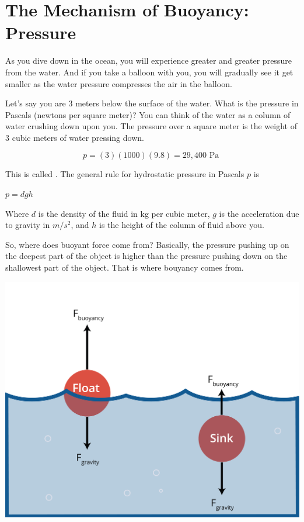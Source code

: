 \section{The Mechanism of Buoyancy: Pressure}

As you dive down in the ocean, you will experience greater and
greater pressure from the water. And if you take a balloon with you, you
will gradually see it get smaller as the water pressure compresses the
air in the balloon.

Let's say you are 3 meters below the surface of the water. What is the
pressure in Pascals (newtons per square meter)? You can think of the
water as a column of water crushing down upon you. The pressure over
a square meter is the weight of 3 cubic meters of water pressing down.

$$p = (3)(1000)(9.8) = 29,400 \text{ Pa }$$

This is called . The general rule for
hydrostatic pressure in Pascals $p$ is

$p = d g h$

Where  $d$ is the density of the fluid
in kg per cubic meter, $g$ is the acceleration due to gravity in
$m/s^2$, and $h$ is the height of the column of fluid above you.

So, where does buoyant force come from? Basically, the pressure pushing up on the
deepest part of the object is higher than the pressure pushing down on
the shallowest part of the object. That is where bouyancy comes from.

\includegraphics[width=1\textwidth]{buoyancy.png}

